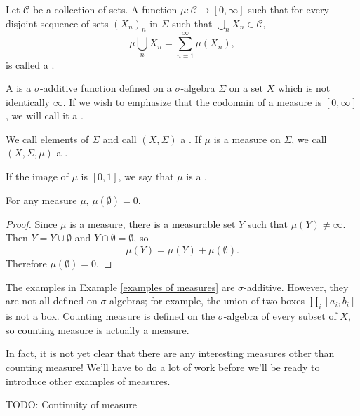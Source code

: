 \begin{definition}
Let $\mathcal C$ be a collection of sets.
A function $\mu: \mathcal C \to [0, \infty]$ such that for every disjoint sequence of sets $(X_{n})_{n}$ in $\Sigma$ such that $\bigcup_{n} X_{n} \in \mathcal C$,
\[\mu\bigcup_{n} X_{n} = \sum_{n=1}^{\infty} \mu(X_{n}),\]
is called a .
\end{definition}

\begin{definition}
A  is a $\sigma$-additive function defined on a $\sigma$-algebra $\Sigma$ on a set $X$ which is not identically $\infty$.
If we wish to emphasize that the codomain of a measure is $[0, \infty]$, we will call it a .

We call elements of $\Sigma$  and call $(X, \Sigma)$ a .
If $\mu$ is a measure on $\Sigma$, we call $(X, \Sigma, \mu)$ a .

If the image of $\mu$ is $[0, 1]$, we say that $\mu$ is a .
\end{definition}

\begin{lemma}
\label{empty set is null}
For any measure $\mu$, $\mu(\emptyset) = 0$.
\end{lemma}
\begin{proof}
Since $\mu$ is a measure, there is a measurable set $Y$ such that $\mu(Y) \neq \infty$.
Then $Y = Y \cup \emptyset$ and $Y \cap \emptyset = \emptyset$, so
\[\mu(Y) = \mu(Y) + \mu(\emptyset).\]
Therefore $\mu(\emptyset) = 0$.
\end{proof}

\begin{example}
The examples in Example \ref{examples of measures} are $\sigma$-additive.
However, they are not all defined on $\sigma$-algebras; for example, the union of two boxes $\prod_{i} [a_i, b_i]$ is not a box.
Counting measure is defined on the $\sigma$-algebra of every subset of $X$, so counting measure is actually a measure.

In fact, it is not yet clear that there are any interesting measures other than counting measure!
We'll have to do a lot of work before we'll be ready to introduce other examples of measures.
\end{example}

\begin{theorem}
TODO: Continuity of measure
\end{theorem}

